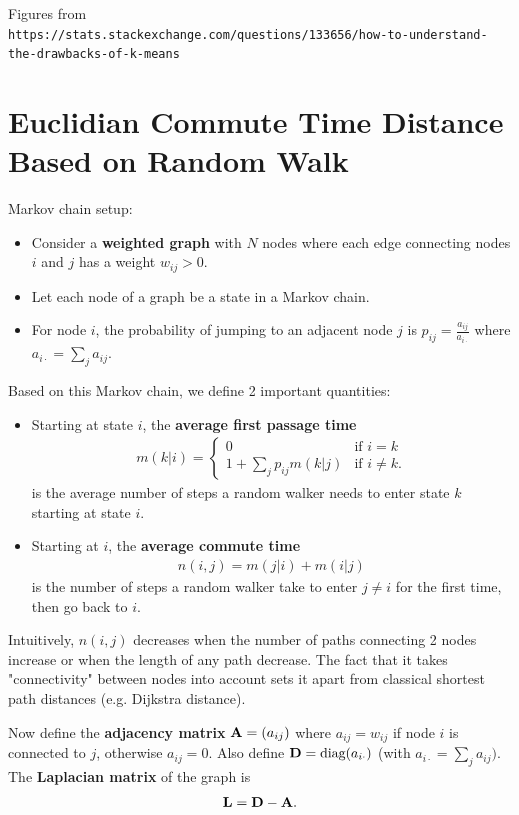 \documentclass[./some_latex_template.tex]{subfiles}
\begin{document}
Figures from\\
\texttt{https://stats.stackexchange.com/questions/133656/how-to-understand-the-drawbacks-of-k-means}

\section{Euclidian
Commute Time Distance Based on Random Walk}

Markov chain setup:
\begin{itemize}
	\item Consider a \textbf{weighted graph} with $N$ nodes where each edge connecting nodes $i$ and $j$ has a weight $w_{ij} > 0$. 
	\item Let each node of a graph be a state in a Markov chain. 
	\item For node $i$, the probability of jumping to an adjacent node $j$ is $p_{ij} = \frac{a_{ij}}{a_{i\cdot}}$ where $a_{i\cdot} = \sum_{j} a_{ij}.$
\end{itemize}

\noindent Based on this Markov chain, we define 2 important quantities: 

\begin{itemize}
	\item Starting at state $i$, the \textbf{average first passage time} \begin{align*}
		m(k|i) = 
		\begin{cases}
			0 & \text{if } i = k\\
			1 + \sum_{j} p_{ij}m(k|j) & \text{if } i\neq k.
		\end{cases}
	\end{align*}
	is the average number of steps a random walker needs to enter state $k$ starting at state $i$.
	\item Starting at $i$, the \textbf{average commute time} 
	\begin{align*}
		n(i,j) = m(j|i) + m(i|j)
	\end{align*}
	is the number of steps a random walker take to enter $j \neq i$ for the first time, then go back to $i$. 
\end{itemize}

Intuitively, $n(i, j)$ decreases when the number of paths connecting 2 nodes increase or when the length of any path decrease. The fact that it takes "connectivity" between nodes into account sets it apart from classical shortest path distances (e.g. Dijkstra distance). 

Now define the \textbf{adjacency matrix} $\mathbf{A} = (a_{ij})$ where $a_{ij} = w_{ij}$ if node $i$ is connected to $j$, otherwise $a_{ij} = 0$. Also define $\mathbf{D} = \text{diag}(a_{i\cdot})$ (with $a_{i\cdot} = \sum_{j}a_{ij})$. The \textbf{Laplacian matrix} of the graph is 
\begin{align*}
	\mathbf{L} = \mathbf{D} - \mathbf{A}.
\end{align*}
\end{document}
